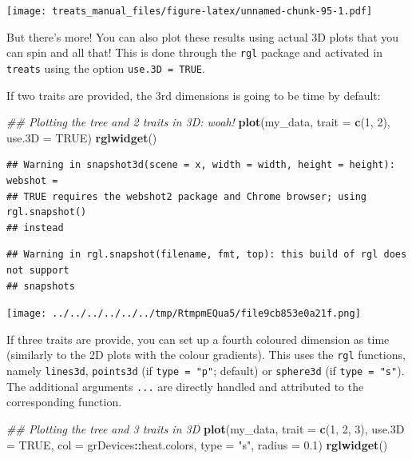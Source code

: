 \documentclass[
]{book}
\newenvironment{Shaded}{\begin{snugshade}}{\end{snugshade}}
\newcommand{\CommentTok}[1]{\textcolor[rgb]{0.56,0.35,0.01}{\textit{#1}}}
\newcommand{\DataTypeTok}[1]{\textcolor[rgb]{0.13,0.29,0.53}{#1}}
\newcommand{\DecValTok}[1]{\textcolor[rgb]{0.00,0.00,0.81}{#1}}
\newcommand{\FloatTok}[1]{\textcolor[rgb]{0.00,0.00,0.81}{#1}}
\newcommand{\KeywordTok}[1]{\textcolor[rgb]{0.13,0.29,0.53}{\textbf{#1}}}
\newcommand{\NormalTok}[1]{#1}
\newcommand{\OperatorTok}[1]{\textcolor[rgb]{0.81,0.36,0.00}{\textbf{#1}}}
\newcommand{\OtherTok}[1]{\textcolor[rgb]{0.56,0.35,0.01}{#1}}
\newcommand{\StringTok}[1]{\textcolor[rgb]{0.31,0.60,0.02}{#1}}
\begin{document}
\texttt{[image: treats\_manual\_files/figure-latex/unnamed-chunk-95-1.pdf]}

But there's more! You can also plot these results using actual 3D plots that you can spin and all that!
This is done through the \texttt{rgl} package and activated in \texttt{treats} using the option \texttt{use.3D\ =\ TRUE}.

If two traits are provided, the 3rd dimensions is going to be time by default:

\begin{Shaded}
\begin{Highlighting}[]
\CommentTok{\#\# Plotting the tree and 2 traits in 3D: woah!}
\KeywordTok{plot}\NormalTok{(my\_data, }\DataTypeTok{trait =} \KeywordTok{c}\NormalTok{(}\DecValTok{1}\NormalTok{, }\DecValTok{2}\NormalTok{), }\DataTypeTok{use.3D =} \OtherTok{TRUE}\NormalTok{)}
\KeywordTok{rglwidget}\NormalTok{()}
\end{Highlighting}
\end{Shaded}

\begin{verbatim}
## Warning in snapshot3d(scene = x, width = width, height = height): webshot =
## TRUE requires the webshot2 package and Chrome browser; using rgl.snapshot()
## instead
\end{verbatim}

\begin{verbatim}
## Warning in rgl.snapshot(filename, fmt, top): this build of rgl does not support
## snapshots
\end{verbatim}

\texttt{[image: ../../../../../../tmp/RtmpmEQua5/file9cb853e0a21f.png]}

If three traits are provide, you can set up a fourth coloured dimension as time (similarly to the 2D plots with the colour gradients).
This uses the \texttt{rgl} functions, namely \texttt{lines3d}, \texttt{points3d} (if \texttt{type\ =\ "p"}; default) or \texttt{sphere3d} (if \texttt{type\ =\ "s"}).
The additional arguments \texttt{...} are directly handled and attributed to the corresponding function.

\begin{Shaded}
\begin{Highlighting}[]
\CommentTok{\#\# Plotting the tree and 3 traits in 3D}
\KeywordTok{plot}\NormalTok{(my\_data, }\DataTypeTok{trait =} \KeywordTok{c}\NormalTok{(}\DecValTok{1}\NormalTok{, }\DecValTok{2}\NormalTok{, }\DecValTok{3}\NormalTok{), }\DataTypeTok{use.3D =} \OtherTok{TRUE}\NormalTok{,}
     \DataTypeTok{col =}\NormalTok{ grDevices}\OperatorTok{::}\NormalTok{heat.colors, }\DataTypeTok{type =} \StringTok{"s"}\NormalTok{, }\DataTypeTok{radius =} \FloatTok{0.1}\NormalTok{)}
\KeywordTok{rglwidget}\NormalTok{()}
\end{Highlighting}
\end{Shaded}
\end{document}
